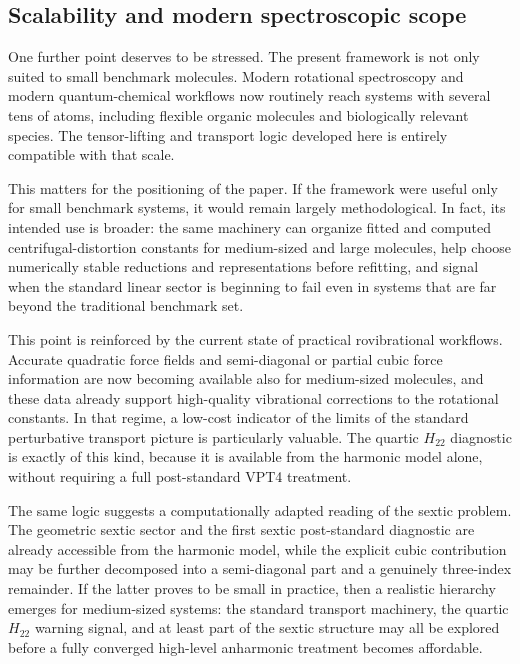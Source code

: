 \subsection{Scalability and modern spectroscopic scope}

One further point deserves to be stressed. The present framework is not only
suited to small benchmark molecules. Modern rotational spectroscopy and modern
quantum-chemical workflows now routinely reach systems with several tens of
atoms, including flexible organic molecules and biologically relevant species.
The tensor-lifting and transport logic developed here is entirely compatible
with that scale.

This matters for the positioning of the paper. If the framework were useful
only for small benchmark systems, it would remain largely methodological. In
fact, its intended use is broader: the same machinery can organize fitted and
computed centrifugal-distortion constants for medium-sized and large
molecules, help choose numerically stable reductions and representations
before refitting, and signal when the standard linear sector is beginning to
fail even in systems that are far beyond the traditional benchmark set.

This point is reinforced by the current state of practical rovibrational
workflows. Accurate quadratic force fields and semi-diagonal or partial cubic
force information are now becoming available also for medium-sized molecules,
and these data already support high-quality vibrational corrections to the
rotational constants. In that regime, a low-cost indicator of the limits of
the standard perturbative transport picture is particularly valuable. The
quartic $H_{22}$ diagnostic is exactly of this kind, because it is available
from the harmonic model alone, without requiring a full post-standard VPT4
treatment.

The same logic suggests a computationally adapted reading of the sextic
problem. The geometric sextic sector and the first sextic post-standard
diagnostic are already accessible from the harmonic model, while the explicit
cubic contribution may be further decomposed into a semi-diagonal part and a
genuinely three-index remainder. If the latter proves to be small in practice,
then a realistic hierarchy emerges for medium-sized systems: the standard
transport machinery, the quartic $H_{22}$ warning signal, and at least part of
the sextic structure may all be explored before a fully converged high-level
anharmonic treatment becomes affordable.

